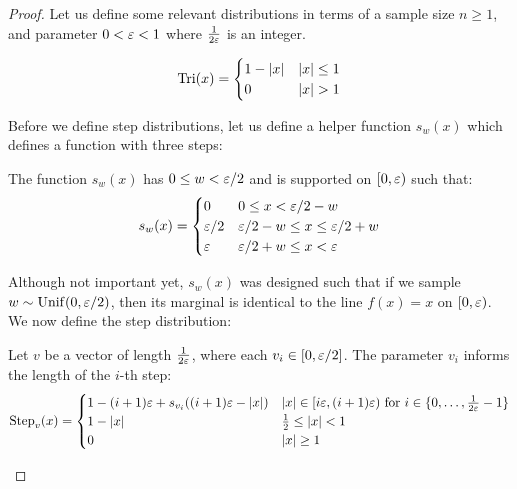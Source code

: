 \adaptivelb*
\begin{proof}
Let us define some relevant distributions in terms of a sample size $n \ge 1$, and parameter $0 < \varepsilon < 1$ where $\frac{1}{2 \varepsilon}$ is an integer. 



\begin{definition}
     \begin{align*}
     \operatorname{Tri}(x) = \begin{cases} 
          1-|x| & |x| \le 1 \\
          0 & |x| > 1 
       \end{cases}
       \end{align*}
\end{definition}

Before we define step distributions, let us define a helper function $s_w(x)$ which defines a function with three steps: 

\begin{definition} The function $s_w(x)$ has $0 \le w < \varepsilon/2$ and is supported on $[0,\varepsilon)$ such that:
    \begin{align*}
     s_w(x) = \begin{cases} 
          0 & 0 \le x<\varepsilon/2-w\\
          \varepsilon/2  & \varepsilon/2-w \le x \le \varepsilon/2+w \\
          \varepsilon & \varepsilon/2+w \le x < \varepsilon
       \end{cases}
    \end{align*}
\end{definition}

Although not important yet, $s_w(x)$ was designed such that if we sample $w \sim \operatorname{Unif}(0,\varepsilon/2)$, then its marginal is identical to the line $f(x)=x$ on $[0,\varepsilon)$. We now define the step distribution:

\begin{definition} Let $v$ be a vector of length $\frac{1}{2\varepsilon}$, where each $v_i \in [0,\varepsilon/2]$. The parameter $v_i$ informs the length of the $i$-th step:
     \begin{align*}
     \operatorname{Step}_v(x) = \begin{cases} 
          1 - (i+1)\varepsilon + s_{v_i}((i+1)\varepsilon - |x|) & |x| \in [i\varepsilon,(i+1)\varepsilon) \textrm{ for } i \in \{0,\dots,\frac{1}{2\varepsilon}-1\}\\
          1-|x| & \frac{1}{2} \le |x| < 1 \\
          0 & |x| \ge 1
       \end{cases}
    \end{align*}
\end{definition}


\end{proof}
